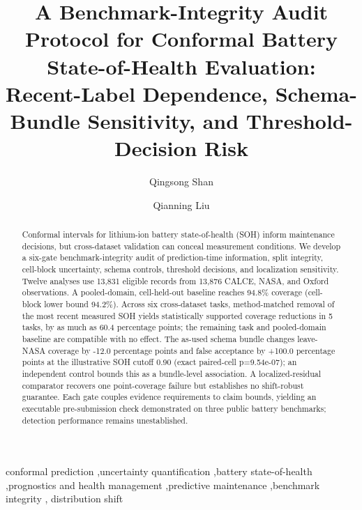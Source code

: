 \documentclass[
  number,
  preprint]{elsarticle}
\begin{document}
\begin{frontmatter}
\title{A Benchmark-Integrity Audit Protocol for Conformal Battery
State-of-Health Evaluation: Recent-Label Dependence, Schema-Bundle
Sensitivity, and Threshold-Decision Risk}
\author[1]{Qingsong Shan%
%
}
\author[1]{Qianning Liu%
%
}


        
\begin{abstract}
Conformal intervals for lithium-ion battery state-of-health (SOH) inform
maintenance decisions, but cross-dataset validation can conceal
measurement conditions. We develop a six-gate benchmark-integrity audit
of prediction-time information, split integrity, cell-block uncertainty,
schema controls, threshold decisions, and localization sensitivity.
Twelve analyses use 13,831 eligible records from 13,876 CALCE, NASA, and
Oxford observations. A pooled-domain, cell-held-out baseline reaches
94.8\% coverage (cell-block lower bound 94.2\%). Across six
cross-dataset tasks, method-matched removal of the most recent measured
SOH yields statistically supported coverage reductions in 5 tasks, by as
much as 60.4 percentage points; the remaining task and pooled-domain
baseline are compatible with no effect. The as-used schema bundle
changes leave-NASA coverage by -12.0 percentage points and false
acceptance by +100.0 percentage points at the illustrative SOH cutoff
0.90 (exact paired-cell p=9.54e-07); an independent control bounds this
as a bundle-level association. A localized-residual comparator recovers
one point-coverage failure but establishes no shift-robust guarantee.
Each gate couples evidence requirements to claim bounds, yielding an
executable pre-submission check demonstrated on three public battery
benchmarks; detection performance remains unestablished.
\end{abstract}





\begin{keyword}
    conformal prediction \sep uncertainty quantification \sep battery
state-of-health \sep prognostics and health management \sep predictive
maintenance \sep benchmark integrity \sep 
    distribution shift
\end{keyword}
\end{frontmatter}
    
\end{document}
